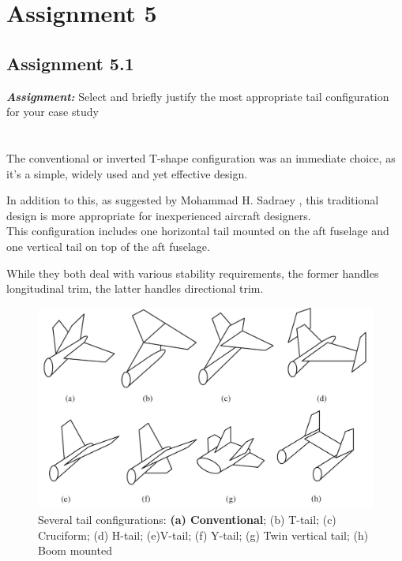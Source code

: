 \documentclass{article}
\begin{document}
\clearpage

\section{Assignment 5\label{Assignment_5}}

\subsection{Assignment 5.1\label{Assignment_5.1}}

\textbf{\textit{Assignment:}} Select and briefly justify the most appropriate
 tail configuration for your case study \\ \\ \\ 

The conventional or inverted T-shape configuration was an immediate choice, as it's a simple, widely
used and yet effective design. 

In addition to this, as suggested by Mohammad H. Sadraey \autocite{Sadraey_Mohammad}, this traditional design is more appropriate
for inexperienced aircraft designers. \\ 

This configuration includes one horizontal tail mounted on the
aft fuselage and one vertical tail on top of the aft fuselage.

While they both deal with various stability requirements, the former handles longitudinal trim, 
the latter handles directional trim. \\ 


\begin{figure}[h!]
    \centering
    \includegraphics[width=\textwidth]{Sources/Plots_and_Pictures/tail_config.png}
    \caption{Several tail configurations: \textbf{(a) Conventional}; (b) T-tail; (c) Cruciform; (d) H-tail;
    (e)V-tail; (f) Y-tail; (g) Twin vertical tail; (h) Boom mounted \autocite{Sadraey_Mohammad}}
    \label{tail_config}
\end{figure}
\end{document}
